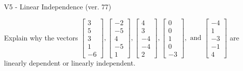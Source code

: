\begin{exercise}
  \begin{exerciseTitle}V5 - Linear Independence (ver. 77)\end{exerciseTitle}
  \begin{exerciseStatement}
    Explain why the vectors \(\left[\begin{array}{r}
3 \\
5 \\
3 \\
1 \\
-6
\end{array}\right] , \left[\begin{array}{r}
-2 \\
-5 \\
4 \\
-5 \\
1
\end{array}\right] , \left[\begin{array}{r}
4 \\
3 \\
-4 \\
-4 \\
2
\end{array}\right] , \left[\begin{array}{r}
0 \\
0 \\
1 \\
0 \\
-3
\end{array}\right] , \text{ and } \left[\begin{array}{r}
-4 \\
1 \\
-3 \\
-1 \\
4
\end{array}\right]\) are linearly dependent or linearly independent.	



\end{exerciseStatement}
\end{exercise}
